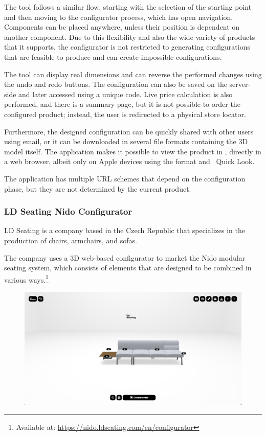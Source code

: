 The tool follows a similar flow, starting with the selection of the starting point and then moving to the configurator process, which has open navigation. Components can be placed anywhere, unless their position is dependent on another component. Due to this flexibility and also the wide variety of products that it supports, the configurator is not restricted to generating configurations that are feasible to produce and can create impossible configurations.

The tool can display real dimensions and can reverse the performed changes using the undo and redo buttons. The configuration can also be saved on the server-side and later accessed using a unique code. Live price calculation is also performed, and there is a summary page, but it is not possible to order the configured product; instead, the user is redirected to a physical store locator.

Furthermore, the designed configuration can be quickly shared with other users using email, or it can be downloaded in several file formats containing the 3D model itself. The application makes it possible to view the product in , directly in a web browser, albeit only on Apple devices using the  format and ~Quick Look.~\cite{Jackson2018}

The application has multiple URL schemes that depend on the configuration phase, but they are not determined by the current product. 

\subsubsection{LD Seating Nido Configurator}

LD Seating is a company based in the Czech Republic that specializes in the production of chairs, armchairs, and sofas.~\cite{LDSeating}

The company uses a 3D web-based configurator to market the Nido modular seating system, which consists of elements that are designed to be combined in various ways.\footnote{Available at: \url{https://nido.ldseating.com/en/configurator}}~\cite{NidoConfigurator}

\begin{figure}[ht]
\centering
\includegraphics[width=\textwidth]{images/analysis_nido-configurator.png}
\end{figure}

